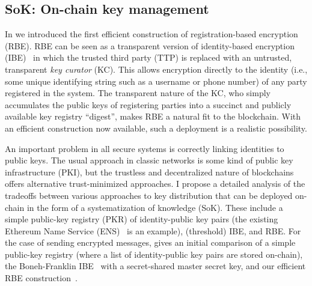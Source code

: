 \subsection{SoK: On-chain key management}\label{sec:sok}

In \cite{CCS:GKMR23} we introduced the first efficient construction of registration-based encryption (RBE). RBE can be seen as a transparent version of identity-based encryption (IBE)~\cite{C:Shamir84} in which the trusted third party (TTP) is replaced with an untrusted, transparent \emph{key curator} (KC). This allows encryption directly to the identity (i.e., some unique identifying string such as a username or phone number) of any party registered in the system. The transparent nature of the KC, who simply accumulates the public keys of registering parties into a succinct and publicly available key registry ``digest'', makes RBE a natural fit to the blockchain. With an efficient construction now available, such a deployment is a realistic possibility.

An important problem in all secure systems is correctly linking identities to public keys. The usual approach in classic networks is some kind of public key infrastructure (PKI), but the trustless and decentralized nature of blockchains offers alternative trust-minimized approaches. I propose a detailed analysis of the tradeoffs between various approaches to key distribution that can be deployed on-chain in the form of a systematization of knowledge (SoK). These include a simple public-key registry (PKR) of identity-public key pairs (the existing Ethereum Name Service (ENS)~\cite{ens} is an example), (threshold) IBE, and RBE. For the case of sending encrypted messages,  gives an initial comparison of a simple public-key registry (where a list of identity-public key pairs are stored on-chain), the Boneh-Franklin IBE~\cite{C:BonFra01} with a secret-shared master secret key, and our efficient RBE construction~\cite{CCS:GKMR23}.

